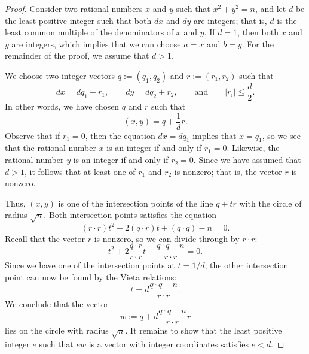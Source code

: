 \begin{proof}
  Consider two rational numbers $x$ and $y$ such that $x^2+y^2=n$, and let $d$ be the least positive integer such that both $dx$ and $dy$ are integers; that is, $d$ is the least common multiple of the denominators of $x$ and $y$. If $d=1$, then both $x$ and $y$ are integers, which implies that we can choose $a=x$ and $b=y$. For the remainder of the proof, we assume that $d>1$.

  We choose two integer vectors $q:=(q_1,q_2)$ and $r:=(r_1,r_2)$ such that
  \begin{equation*}
    dx=dq_1+r_1,\qquad dy=dq_2+r_2,\qquad\text{and}\qquad |r_i|\leq \frac{d}{2}.
  \end{equation*}
  In other words, we have chosen $q$ and $r$ such that
  \begin{equation*}
    (x,y)=q+\frac{1}{d}r.
  \end{equation*}
  Observe that if $r_1=0$, then the equation $dx=dq_1$ implies that $x=q_1$, so we see that the rational number $x$ is an integer if and only if $r_1=0$. Likewise, the rational number $y$ is an integer if and only if $r_2=0$. Since we have assumed that $d>1$, it follows that at least one of $r_1$ and $r_2$ is nonzero; that is, the vector $r$ is nonzero.
  
  Thus, $(x,y)$ is one of the intersection points of the line $q+tr$ with the circle of radius $\sqrt{n}$. Both intersection points satisfies the equation
  \begin{equation*}
    (r\cdot r)t^2+2(q\cdot r)t+(q\cdot q)-n=0.
  \end{equation*}
  Recall that the vector $r$ is nonzero, so we can divide through by $r\cdot r$:
  \begin{equation*}
    t^2+2\frac{q\cdot r}{r\cdot r} t+\frac{q\cdot q-n}{r\cdot r}=0.
  \end{equation*}
  Since we have one of the intersection points at $t=1/d$, the other intersection point can now be found by the Vieta relations:
  \begin{equation*}
    t= d\frac{q\cdot q-n}{r\cdot r}.
  \end{equation*}
  We conclude that the vector
  \begin{equation*}
    w:= q+ d\frac{q\cdot q-n}{r\cdot r}r
  \end{equation*}
  lies on the circle with radius $\sqrt{n}$. It remains to show that the least positive integer $e$ such that $ew$ is a vector with integer coordinates satisfies $e<d$. 


\end{proof}
